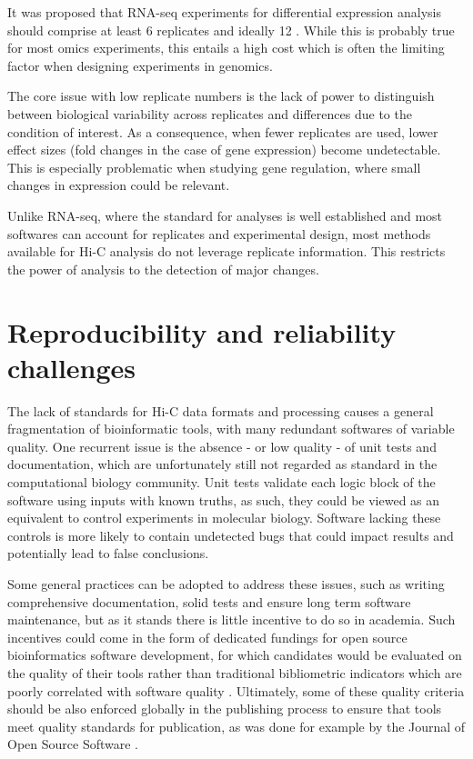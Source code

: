 It was proposed that RNA-seq experiments for differential expression analysis should comprise at least 6 replicates and ideally 12 \cite{schurchHowManyBiological2016}. While this is probably true for most omics experiments, this entails a high cost which is often the limiting factor when designing experiments in genomics.

The core issue with low replicate numbers is the lack of power to distinguish between biological variability across replicates and differences due to the condition of interest. As a consequence, when fewer replicates are used, lower effect sizes (fold changes in the case of gene expression) become undetectable. This is especially problematic when studying gene regulation, where small changes in expression could be relevant.

Unlike RNA-seq, where the standard for analyses is well established and most softwares can account for replicates and experimental design, most methods available for Hi-C analysis do not leverage replicate information. This restricts the power of analysis to the detection of major changes.

\section{Reproducibility and reliability challenges}

The lack of standards for Hi-C data formats and processing causes a general fragmentation of bioinformatic tools, with many redundant softwares of variable quality. One recurrent issue is the absence - or low quality - of unit tests and documentation, which are unfortunately still not regarded as standard in the computational biology community. Unit tests validate each logic block of the software using inputs with known truths, as such, they could be viewed as an equivalent to control experiments in molecular biology. Software lacking these controls is more likely to contain undetected bugs that could impact results and potentially lead to false conclusions.

Some general practices can be adopted to address these issues, such as writing comprehensive documentation, solid tests and ensure long term software maintenance, but as it stands there is little incentive to do so in academia. Such incentives could come in the form of dedicated fundings for open source bioinformatics software development, for which candidates would be evaluated on the quality of their tools rather than traditional bibliometric indicators which are poorly correlated with software quality \cite{gardnerSustainedSoftwareDevelopment2021}. Ultimately, some of these quality criteria should be also enforced globally in the publishing process to ensure that tools meet quality standards for publication, as was done for example by the Journal of Open Source Software \cite{ReviewCriteriaJOSS}.

